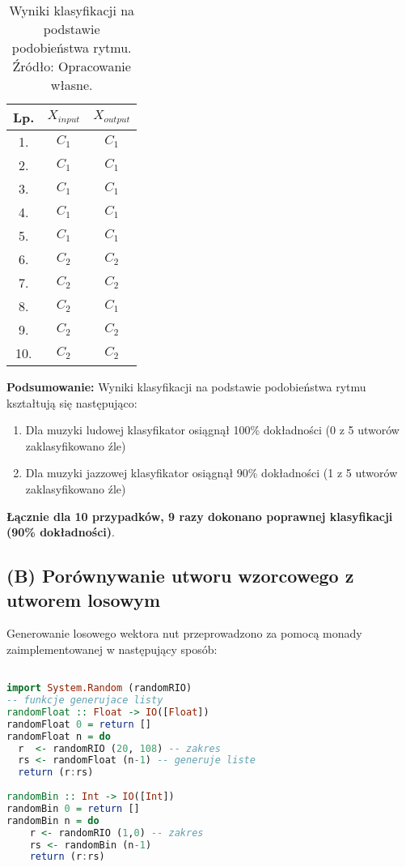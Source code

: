 \begin{table}
\begin{tabular}{|c|c|c|}
\hline
Lp. & $X_{input}$ & $X_{output}$ \\ \hline
1.   & $C_{1}$      & $C_{1}$      \\ \hline
2.   & $C_{1}$      & $C_{1}$     \\ \hline
3.   & $C_{1}$      & $C_{1}$      \\ \hline
4.   & $C_{1}$      & $C_{1}$     \\ \hline
5.   & $C_{1}$      & $C_{1}$      \\ \hline
6.   & $C_{2}$      & $C_{2}$    \\ \hline
7.   & $C_{2}$      & $C_{2}$     \\ \hline
8.   & $C_{2}$      & $C_{1}$     \\ \hline
9.   & $C_{2}$      & $C_{2}$     \\ \hline
10.  & $C_{2}$      & $C_{2}$      \\ \hline
\end{tabular}
\centering
\caption{Wyniki klasyfikacji na podstawie podobieństwa rytmu. Źródło: Opracowanie własne.}
\label{tabela 2}
\end{table}

\textbf{Podsumowanie:}
Wyniki klasyfikacji na podstawie podobieństwa rytmu kształtują się następująco:

\begin{enumerate}
    \item Dla muzyki ludowej klasyfikator osiągnął 100\% dokładności (0 z 5 utworów zaklasyfikowano źle)
    \item Dla muzyki jazzowej klasyfikator osiągnął 90\% dokładności (1 z 5 utworów zaklasyfikowano źle)
\end{enumerate}

\textbf{Łącznie dla 10 przypadków, 9 razy dokonano poprawnej klasyfikacji (90\% dokładności)}.





\subsection{(B) Porównywanie utworu wzorcowego z utworem losowym}

Generowanie losowego wektora nut przeprowadzono za pomocą monady zaimplementowanej w następujący sposób:
\begin{lstlisting}[language = Haskell]

import System.Random (randomRIO) 
-- funkcje generujace listy 
randomFloat :: Float -> IO([Float])
randomFloat 0 = return []
randomFloat n = do
  r  <- randomRIO (20, 108) -- zakres
  rs <- randomFloat (n-1) -- generuje liste
  return (r:rs)
  
randomBin :: Int -> IO([Int])
randomBin 0 = return []
randomBin n = do
    r <- randomRIO (1,0) -- zakres
    rs <- randomBin (n-1)
    return (r:rs)
\end{lstlisting}

